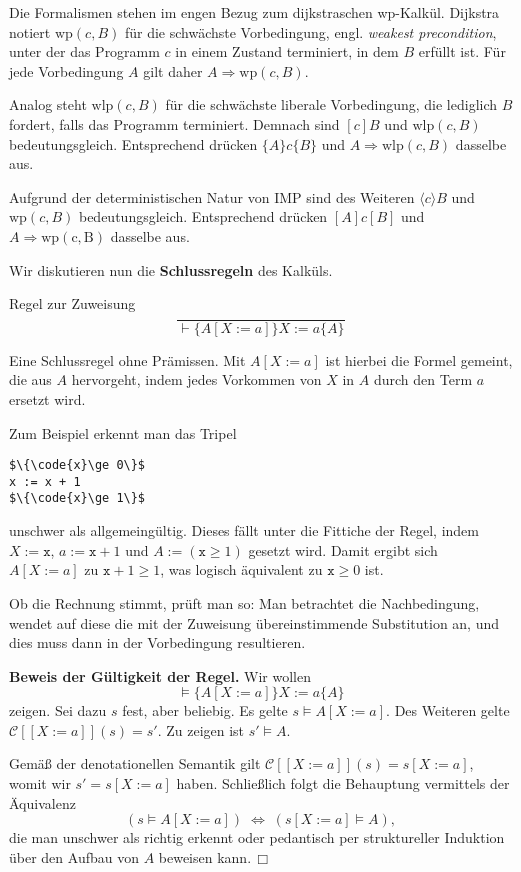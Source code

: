 \documentclass[8pt,fleqn,aspectratio=169]{beamer}
\newcommand{\strong}[1]{\textsf{\textbf{#1}}}
\renewcommand{\qedsymbol}{\ensuremath{\Box}}
\newcommand{\parspace}{\vspace{0.8em}}
\newcommand{\code}[1]{{\texttt{#1}}}
\newcommand{\qb}[1]{[\!\![#1]\!\!]}
\newcommand{\evC}{\mathcal C}
\begin{document}
\begin{frame}
Die Formalismen stehen im engen Bezug zum dijkstraschen wp-Kalkül.
Dijkstra notiert $\mathrm{wp}(c,B)$ für die schwächste Vorbedingung,
engl. \emph{weakest precondition}, unter der das Programm $c$ in einem
Zustand terminiert, in dem $B$ erfüllt ist. Für jede Vorbedingung $A$
gilt daher $A\Rightarrow\mathrm{wp}(c,B)$.\pause

\parspace
Analog steht $\mathrm{wlp}(c,B)$ für die schwächste liberale
Vorbedingung, die lediglich $B$ fordert, falls das Programm terminiert.
Demnach sind $[c]B$ und $\mathrm{wlp}(c,B)$ bedeutungsgleich.
Entsprechend drücken $\{A\}c\{B\}$ und $A\Rightarrow\mathrm{wlp}(c,B)$
dasselbe aus.\pause

\parspace
Aufgrund der deterministischen Natur von IMP sind des Weiteren
$\langle c\rangle B$ und $\mathrm{wp}(c,B)$ bedeutungsgleich.
Entsprechend drücken $[A]c[B]$ und $A\Rightarrow\mathrm{wp(c,B)}$
dasselbe aus.
\end{frame}

\begin{frame}[fragile]
Wir diskutieren nun die \strong{Schlussregeln} des Kalküls.\pause

\parspace
\begin{block}{Regel zur Zuweisung}
\[\dfrac{}{\vdash\{A[X:=a]\}X:=a\{A\}}\]
\end{block}
Eine Schlussregel ohne Prämissen. Mit $A[X:=a]$ ist hierbei die
Formel gemeint, die aus $A$ hervorgeht, indem jedes Vorkommen von
$X$ in $A$ durch den Term $a$ ersetzt wird.\pause

\parspace
Zum Beispiel erkennt man das Tripel
\begin{lstlisting}[language=IMP, xleftmargin=\mathindent, mathescape]
$\{\code{x}\ge 0\}$
x := x + 1
$\{\code{x}\ge 1\}$
\end{lstlisting}
unschwer als allgemeingültig. Dieses fällt unter die Fittiche der
Regel, indem $X:=\code{x}$, $a:=\code{x}+1$ und $A:=(\code{x}\ge 1)$
gesetzt wird. Damit ergibt sich $A[X:=a]$ zu $\code{x} + 1\ge 1$,
was logisch äquivalent zu $\code{x}\ge 0$ ist.
\end{frame}

\begin{frame}
Ob die Rechnung stimmt, prüft man so: Man betrachtet die Nachbedingung,
wendet auf diese die mit der Zuweisung übereinstimmende Substitution an,
und dies muss dann in der Vorbedingung resultieren.\pause

\parspace
\strong{Beweis der Gültigkeit der Regel.} Wir wollen
\[\models\{A[X:=a]\}X:=a\{A\}\]
zeigen.\pause{} Sei dazu $s$ fest, aber beliebig. Es gelte $s\models A[X:=a]$.
Des Weiteren gelte $\evC\qb{X:=a}(s)=s'$. Zu zeigen ist $s'\models A$.\pause

\parspace
Gemäß der denotationellen Semantik gilt $\evC\qb{X:=a}(s)=s[X:=a]$, womit
wir $s'=s[X:=a]$ haben. Schließlich folgt die Behauptung vermittels
der Äquivalenz
\[(s\models A[X:=a])\;\Leftrightarrow\; (s[X:=a]\models A),\]
die man unschwer als richtig erkennt oder pedantisch per struktureller
Induktion über den Aufbau von $A$ beweisen kann.\,\qedsymbol
\end{frame}
\end{document}
